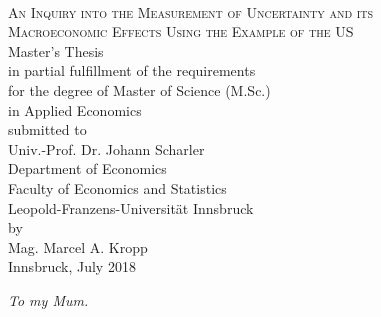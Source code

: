 \documentclass[a4paper,12pt,oneside,pointednumbers,bibtotoc,bigheadings,liststotoc]{scrbook}
\begin{document}
\begin{titlepage}
\begin{center}
        \HRule \\[2mm]
        \large {\scshape An Inquiry into the Measurement of Uncertainty and its\\
        				Macroeconomic Effects Using the Example of the US} \\[10mm]
        \large Master's Thesis \\[10mm]
        \large in partial fulfillment of the requirements \\for the degree of Master of Science (M.Sc.)\\
                  in Applied Economics \\[10mm]
                  
        submitted to\\
        Univ.-Prof. Dr. Johann Scharler \\[10mm]
        Department of Economics\\
        Faculty of Economics and Statistics\\
        Leopold-Franzens-Universität Innsbruck \\[10mm]
        by \\ Mag. Marcel A. Kropp \\[10mm]
        Innsbruck, July 2018
    \end{center}
\end{titlepage}
\restoregeometry

\thispagestyle{empty} %
\null{}
    \begin{flushright}
       \large \textit{To my Mum.}\\
    \end{flushright}
\null
\end{document}
